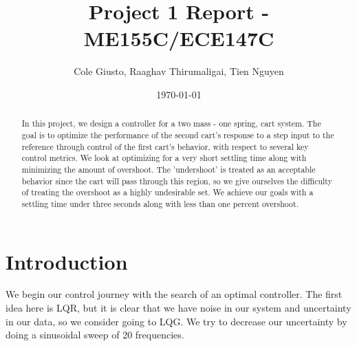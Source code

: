 \documentclass[11pt]{article}
\title{Project 1 Report - ME155C/ECE147C}
\author{Cole Giusto, Raaghav Thirumaligai, Tien Nguyen}
\date{\today}
\begin{document}
\maketitle

\begin{abstract}

In this project, we design a controller for a two mass - one spring, cart system. The goal is to optimize the performance of the second cart's response to a step input to the reference through control of the first cart's behavior, with respect to several key control metrics. We look at optimizing for a very short settling time along with minimizing the amount of overshoot. The 'undershoot' is treated as an acceptable behavior since the cart will pass through this region, so we give ourselves the difficulty of treating the overshoot as a highly undesirable set.
We achieve our goals with a settling time under three seconds along with less than one percent overshoot. 
\end{abstract}

\newpage
\section{Introduction}
We begin our control journey with the search of an optimal controller. The first idea here is LQR, but it is clear that we have noise in our system and uncertainty in our data, so we consider going to LQG. We try to decrease our uncertainty by doing a sinusoidal sweep of 20 frequencies. 

\end{document}
